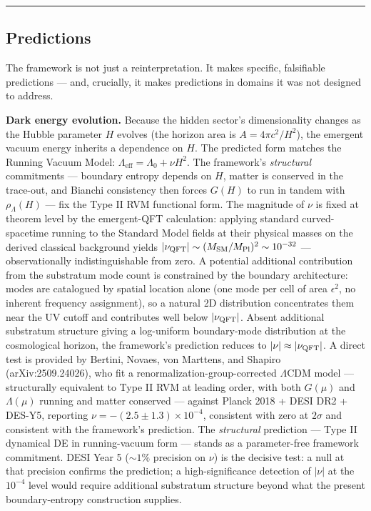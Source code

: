 \documentclass[
]{article}
\begin{document}
\begin{center}\rule{0.5\linewidth}{0.5pt}\end{center}

\hypertarget{predictions}{%
\subsection{Predictions}\label{predictions}}

The framework is not just a reinterpretation. It makes specific,
falsifiable predictions --- and, crucially, it makes predictions in
domains it was not designed to address.

\textbf{Dark energy evolution.} Because the hidden sector's
dimensionality changes as the Hubble parameter \(H\) evolves (the
horizon area is \(A = 4\pi c^2/H^2\)), the emergent vacuum energy
inherits a dependence on \(H\). The predicted form matches the Running
Vacuum Model: \(\Lambda_{\text{eff}} = \Lambda_0 + \nu H^2\). The
framework's \emph{structural} commitments --- boundary entropy depends
on \(H\), matter is conserved in the trace-out, and Bianchi consistency
then forces \(G(H)\) to run in tandem with \(\rho_\Lambda(H)\) --- fix
the Type II RVM functional form. The magnitude of \(\nu\) is fixed at
theorem level by the emergent-QFT calculation: applying standard
curved-spacetime running to the Standard Model fields at their physical
masses on the derived classical background yields
\(|\nu_{\rm QFT}| \sim (M_{\rm SM}/M_{\rm Pl})^2 \sim 10^{-32}\) ---
observationally indistinguishable from zero. A potential additional
contribution from the substratum mode count is constrained by the
boundary architecture: modes are catalogued by spatial location alone
(one mode per cell of area \(\epsilon^2\), no inherent frequency
assignment), so a natural 2D distribution concentrates them near the UV
cutoff and contributes well below \(|\nu_{\rm QFT}|\). Absent additional
substratum structure giving a log-uniform boundary-mode distribution at
the cosmological horizon, the framework's prediction reduces to
\(|\nu| \approx |\nu_{\rm QFT}|\). A direct test is provided by Bertini,
Novaes, von Marttens, and Shapiro (arXiv:2509.24026), who fit a
renormalization-group-corrected \(\Lambda\)CDM model --- structurally
equivalent to Type II RVM at leading order, with both \(G(\mu)\) and
\(\Lambda(\mu)\) running and matter conserved --- against Planck 2018 +
DESI DR2 + DES-Y5, reporting \(\nu = -(2.5 \pm 1.3) \times 10^{-4}\),
consistent with zero at \(2\sigma\) and consistent with the framework's
prediction. The \emph{structural} prediction --- Type II dynamical DE in
running-vacuum form --- stands as a parameter-free framework commitment.
DESI Year 5 (\(\sim 1\%\) precision on \(\nu\)) is the decisive test: a
null at that precision confirms the prediction; a high-significance
detection of \(|\nu|\) at the \(10^{-4}\) level would require additional
substratum structure beyond what the present boundary-entropy
construction supplies.
\end{document}
